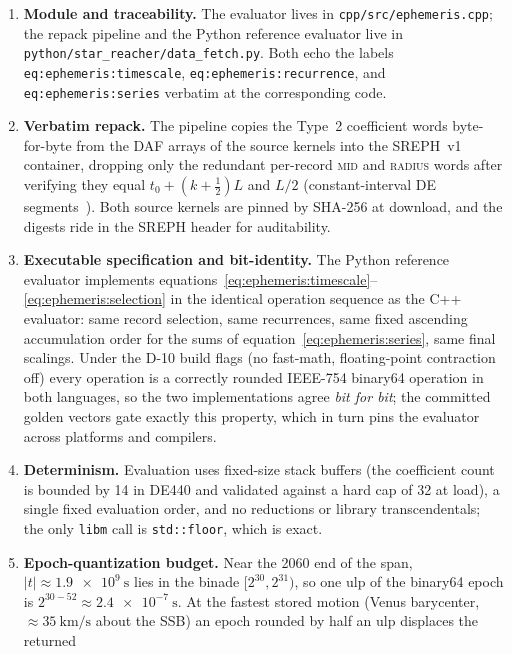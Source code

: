 \begin{enumerate}
  \item \textbf{Module and traceability.} The evaluator lives in
    \texttt{cpp/src/ephemeris.cpp}; the repack pipeline and the Python
    reference evaluator live in \texttt{python/star\_reacher/data\_fetch.py}.
    Both echo the labels \texttt{eq:ephemeris:timescale},
    \texttt{eq:ephemeris:recurrence}, and \texttt{eq:ephemeris:series}
    verbatim at the corresponding code.
  \item \textbf{Verbatim repack.} The pipeline copies the Type~2 coefficient
    words byte-for-byte from the DAF arrays of the source kernels into the
    SREPH~v1 container, dropping only the redundant per-record \textsc{mid}
    and \textsc{radius} words after verifying they equal
    $t_0 + (k + \tfrac12)L$ and $L/2$ (constant-interval DE
    segments~\cite{naifspk}). Both source kernels are pinned by SHA-256 at
    download, and the digests ride in the SREPH header for auditability.
  \item \textbf{Executable specification and bit-identity.} The Python
    reference evaluator implements
    equations~\eqref{eq:ephemeris:timescale}--\eqref{eq:ephemeris:selection}
    in the identical operation sequence as the C++ evaluator: same record
    selection, same recurrences, same fixed ascending accumulation order for
    the sums of equation~\eqref{eq:ephemeris:series}, same final scalings.
    Under the D-10 build flags (no fast-math, floating-point contraction
    off) every operation is a correctly rounded IEEE-754 binary64 operation
    in both languages, so the two implementations agree \emph{bit for bit};
    the committed golden vectors gate exactly this property, which in turn
    pins the evaluator across platforms and compilers.
  \item \textbf{Determinism.} Evaluation uses fixed-size stack buffers (the
    coefficient count is bounded by 14 in DE440 and validated against a
    hard cap of 32 at load), a single fixed evaluation order, and no
    reductions or library transcendentals; the only \texttt{libm} call is
    \texttt{std::floor}, which is exact.
  \item \textbf{Epoch-quantization budget.} Near the 2060 end of the span,
    $|t| \approx \qty{1.9e9}{\second}$ lies in the binade $[2^{30}, 2^{31})$,
    so one ulp of the binary64 epoch is
    $2^{30-52} \approx \qty{2.4e-7}{\second}$. At the fastest
    stored motion (Venus barycenter, $\approx \qty{35}{\kilo\metre\per\second}$
    about the SSB) an epoch rounded by half an ulp displaces the returned

\end{enumerate}
